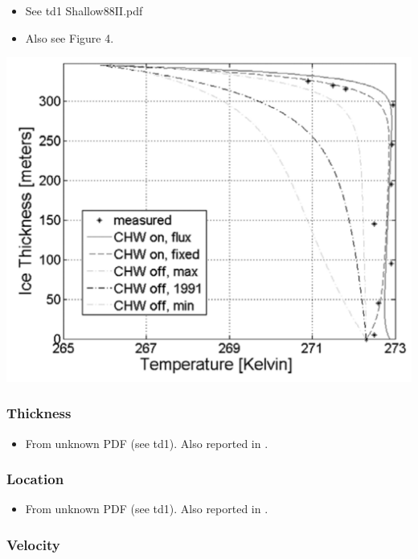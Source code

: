 \documentclass[article,a4paper,times,11pt,twoside]{article}
\begin{document}
\begin{itemize}
\item See td1 Shallow88II.pdf
\item Also see \textcite{phillips_2010} Figure 4.
\end{itemize}

\begin{center}
\includegraphics[width=.9\linewidth]{td3/phillips_2010_fig4.png}
\end{center}

\subsubsection{Thickness}
\label{sec:org5a06220}

\begin{itemize}
\item From unknown PDF (see td1). Also reported in \textcite{phillips_2010}.
\end{itemize}

\subsubsection{Location}
\label{sec:orgff5bbc1}

\begin{itemize}
\item From unknown PDF (see td1). Also reported in \textcite{phillips_2010}.
\end{itemize}

\subsubsection{Velocity}
\label{sec:org150f8b2}
\clearpage
\end{document}
